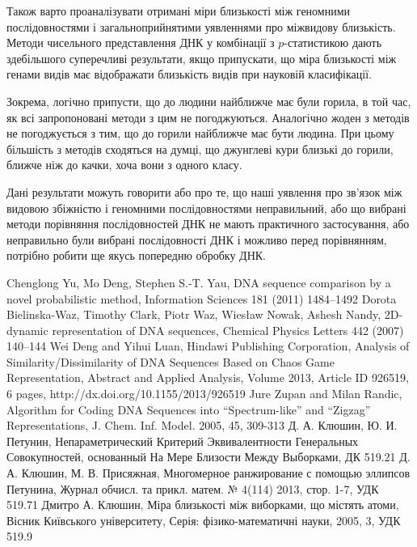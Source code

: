 \documentclass[14pt,a4paper,titlepage]{extarticle}
\begin{document}
Також варто проаналізувати отримані міри близькості між геномними
послідовностями і загальноприйнятими уявленнями про міжвидову близькість.
Методи чисельного представлення ДНК у комбінації з $p$-статистикою дають
здебільшого суперечливі результати, якщо припускати, що міра близькості між
генами видів має відображати близькість видів при науковій класифікації.
\par

Зокрема, логічно припусти, що до людини найближче має були горила, в той час,
як всі запропоновані методи з цим не погоджуються. Аналогічно жоден з методів
не погоджується з тим, що до горили найближче має бути людина. При цьому
більшість з методів сходяться на думці, що джунглеві кури близькі до горили,
ближче ніж до качки, хоча вони з одного класу.

\par
Дані результати можуть говорити або про те, що наші уявлення про зв’язок між
видовою збіжністю і геномними послідовностями неправильний, або що вибрані
методи порівняння послідовностей ДНК не мають практичного застосування, або
неправильно були вибрані послідовності ДНК і можливо перед порівнянням,
потрібно робити ще якусь попередню обробку ДНК.


\newpage
\begin{thebibliography}{9}

Chenglong Yu, Mo Deng, Stephen S.-T. Yau,
DNA sequence comparison by a novel probabilistic method,
Information Sciences 181 (2011) 1484–1492
Dorota Bielinska-Waz, Timothy Clark, Piotr Waz, Wiesław Nowak, Ashesh Nandy,
2D-dynamic representation of DNA sequences,
Chemical Physics Letters 442 (2007) 140–144
Wei Deng and Yihui Luan,
Hindawi Publishing Corporation,
Analysis of Similarity/Dissimilarity of DNA Sequences Based on Chaos Game Representation,
Abstract and Applied Analysis,
Volume 2013, Article ID 926519, 6 pages,
http://dx.doi.org/10.1155/2013/926519
Jure Zupan and Milan Randic,
Algorithm for Coding DNA Sequences into “Spectrum-like” and “Zigzag” Representations,
J. Chem. Inf. Model. 2005, 45, 309-313
Д. А. Клюшин, Ю. И. Петунин,
Непараметрический Критерий Эквивалентности Генеральных Совокупностей, основанный На Мере Близости Между Выборками,
ДК 519.21
Д. А. Клюшин, М. В. Присяжная,
Многомерное ранжирование с помощью эллипсов Петунина,
Журнал обчисл. та прикл. матем. № 4(114) 2013, стор. 1-7,
УДК 519.71
Дмитро А. Клюшин,
Міра близькості між виборками, що містять атоми,
Вісник Київського університету,
Серія: фізико-математичні науки,
2005, 3,
УДК 519.9

\end{thebibliography}
\end{document}
